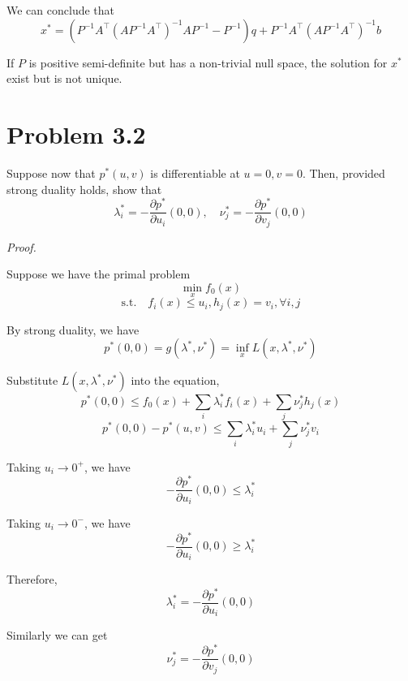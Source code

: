 \documentclass[a4paper]{article}
\begin{document}
We can conclude that
\[x^{*}= {(P^{-1} {A^\intercal} {(A P^{-1} {A^\intercal})^{-1}} A P^{-1} - P^{-1})}q + P^{-1} {A^\intercal} {(A P^{-1} {A^\intercal})^{-1}} b \]

If $P$ is positive semi-definite but has a non-trivial null space, the solution for $x^{*}$ exist but is not unique.

\section{Problem 3.2}

Suppose now that $p^{*}(u,v)$ is differentiable at $u=0, v=0$. Then, provided strong duality holds, show that
\[\lambda_i^{*}=-\frac{\partial p^{*}}{\partial u_i} {(0,0)}, \quad \nu_j^{*}=-\frac{\partial p^{*}}{\partial v_j} {(0,0)}\]

\textit{Proof.}\newline

Suppose we have the primal problem
\[\min_x f_0(x)\]
\[\text{s.t.} \quad f_i(x) \leq u_i, h_j(x)=v_i, \forall i,j\]

By strong duality, we have
\[p^{*}(0,0)=g(\lambda^{*},\nu^{*})=\inf_x L(x,\lambda^{*},\nu^{*})\]

Substitute $L(x,\lambda^{*},\nu^{*})$ into the equation,
\[p^{*}(0,0) \leq f_0(x) + \sum_i {\lambda_i^{*} f_i(x)} + \sum_j {\nu_j^{*} h_j(x)}\]
\[p^{*}(0,0)-p^{*}(u,v) \leq \sum_i {\lambda_i^{*} u_i} + \sum_j {\nu_j^{*} v_i}\]

Taking $u_i \rightarrow 0^{+}$, we have
\[-\frac{\partial p^{*}}{\partial u_i} {(0,0)} \leq \lambda_i^{*}\]

Taking $u_i \rightarrow 0^{-}$, we have
\[-\frac{\partial p^{*}}{\partial u_i} {(0,0)} \geq \lambda_i^{*}\]

Therefore,
\[\lambda_i^{*}=-\frac{\partial p^{*}}{\partial u_i} {(0,0)}\]

Similarly we can get
\[\nu_j^{*}=-\frac{\partial p^{*}}{\partial v_j} {(0,0)}\]
\end{document}
